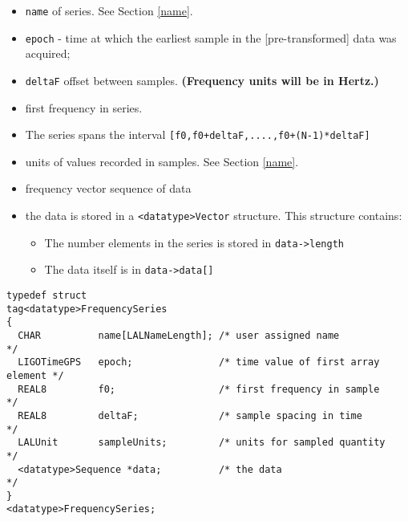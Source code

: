 \documentclass[]{ligodcc}
\begin{document}
\begin{itemize}
\vspace{-0.15in}
\item
{\tt name} of series. See Section \ref{name}.
\vspace{-0.15in}
\item
{\tt epoch} - time at which the earliest sample in 
the [pre-transformed] data was acquired;
\vspace{-0.15in}
\item
{\tt deltaF} offset between samples.  {\bf (Frequency units will be in Hertz.)}
\vspace{-0.15in}
\item
first frequency in series. 
\vspace{-0.15in}
\item
The series spans the interval {\tt [f0,f0+deltaF,....,f0+(N-1)*deltaF] }
\vspace{-0.15in}
\item
units of values recorded in samples. See Section \ref{name}.
\vspace{-0.15in}
\item
frequency vector sequence of data
\vspace{-0.15in}
\item
the data is stored in a {\tt <datatype>Vector}  structure. This structure contains:
\begin{itemize}
\vspace{-0.10in}
\item
The number elements in the series is stored in {\tt data->length}
\vspace{-0.10in}
\item
The data itself is in {\tt data->data[]}
\end{itemize}
\end{itemize}

{\footnotesize
\begin{verbatim}
typedef struct
tag<datatype>FrequencySeries
{
  CHAR          name[LALNameLength]; /* user assigned name                */
  LIGOTimeGPS   epoch;               /* time value of first array element */
  REAL8         f0;                  /* first frequency in sample         */
  REAL8         deltaF;              /* sample spacing in time            */
  LALUnit       sampleUnits;         /* units for sampled quantity        */
  <datatype>Sequence *data;          /* the data                          */
}
<datatype>FrequencySeries;
\end{verbatim}}
\end{document}
